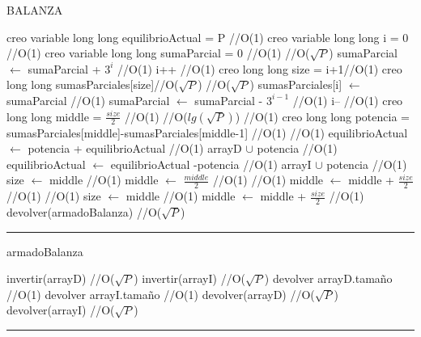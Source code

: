 \begin{algorithm}[H]
\caption{BALANZA}
\begin{algorithmic}[1]
\state creo variable long long equilibrioActual = P \hfill //O(1)
\state creo variable long long i = 0 \hfill //O(1)
\state creo variable long long sumaParcial = 0 \hfill //O(1)
 \hfill //O($\sqrt{P}$)
\state sumaParcial  $\gets$ sumaParcial + $3^i$ \hfill //O(1)
\state i++ \hfill //O(1)
\endwhile
\state creo long long size = i+1\hfill //O(1)
\state creo long long sumasParciales[size]\hfill //O($\sqrt{P}$)
 \hfill //O($\sqrt{P}$)
\state sumasParciales[i]  $\gets$ sumaParcial \hfill //O(1)
\state sumaParcial $\gets$ sumaParcial - $3^{i-1}$ \hfill //O(1)
\state i-- \hfill //O(1)
\endwhile
\state creo long long middle = $\frac{size}{2}$ \hfill //O(1)
 \hfill //O($lg(\sqrt{P})$) 
 \hfill //O(1)
\state creo long long potencia = sumasParciales[middle]-sumasParciales[middle-1] \hfill //O(1)
 \hfill //O(1)
\state  equilibrioActual $\gets$ potencia + equilibrioActual \hfill //O(1)
\state arrayD $\cup$ potencia \hfill //O(1)
\Else
\state  equilibrioActual $\gets$ equilibrioActual -potencia \hfill //O(1)
\state arrayI $\cup$ potencia \hfill //O(1)
\endif
\state size $\gets$ middle \hfill //O(1)
\state middle $\gets$ $\frac{middle}{2}$ \hfill //O(1)
\endif
{} \hfill //O(1)
\state middle $\gets$ middle + $\frac{size}{2}$ \hfill //O(1)
\endif
{} \hfill //O(1)
\state size $\gets$ middle  \hfill //O(1)
\state middle $\gets$ middle + $\frac{size}{2}$ \hfill //O(1)
\endif
\endwhile
\state devolver(armadoBalanza) \hfill //O($\sqrt{P}$)
\EndFunction 
\end{algorithmic}
\hrule
{}
\end{algorithm}

\begin{algorithm}[H]
\caption{armadoBalanza}
\begin{algorithmic}[1]
\state invertir(arrayD) \hfill //O($\sqrt{P}$)
\state invertir(arrayI) \hfill //O($\sqrt{P}$)
\state devolver arrayD.tamaño \hfill //O(1)
\state devolver arrayI.tamaño \hfill //O(1)
\state devolver(arrayD) \hfill //O($\sqrt{P}$)
\state devolver(arrayI) \hfill //O($\sqrt{P}$)
\EndFunction 
\end{algorithmic}
\hrule
{}
\end{algorithm}